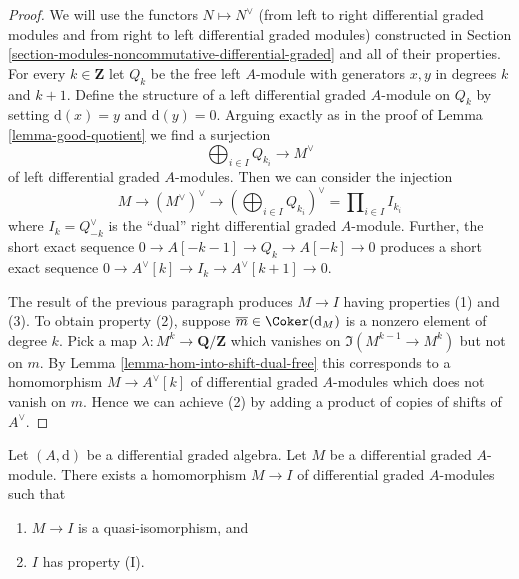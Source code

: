 \begin{proof}
We will use the functors $N \mapsto N^\vee$ (from left to right
differential graded modules and from right to left differential
graded modules) constructed in
Section \ref{section-modules-noncommutative-differential-graded}
and all of their properties.
For every $k \in \mathbf{Z}$ let $Q_k$ be the free left $A$-module with
generators $x, y$ in degrees $k$ and $k + 1$. Define the structure of a
left differential graded $A$-module on $Q_k$ by setting $\text{d}(x) = y$
and $\text{d}(y) = 0$. Arguing exactly as in the proof of
Lemma \ref{lemma-good-quotient} we find a surjection
$$
\bigoplus\nolimits_{i \in I} Q_{k_i} \longrightarrow M^\vee
$$
of left differential graded $A$-modules. Then we can consider the injection
$$
M \to (M^\vee)^\vee \to (\bigoplus\nolimits_{i \in I} Q_{k_i})^\vee =
\prod\nolimits_{i \in I} I_{k_i}
$$
where $I_k = Q_{-k}^\vee$ is the ``dual'' right differential graded $A$-module.
Further, the short exact sequence $0 \to A[-k - 1] \to Q_k \to A[-k] \to 0$
produces a short exact sequence
$0 \to A^\vee[k] \to I_k \to A^\vee[k + 1] \to 0$.

\medskip\noindent
The result of the previous paragraph produces $M \to I$
having properties (1) and (3). To obtain property (2), suppose
$\overline{m} \in \Coker(\text{d}_M)$ is a nonzero element of
degree $k$. Pick a map $\lambda : M^k \to \mathbf{Q}/\mathbf{Z}$
which vanishes on $\Im(M^{k - 1} \to M^k)$ but not on $m$. By
Lemma \ref{lemma-hom-into-shift-dual-free}
this corresponds to a homomorphism $M \to A^\vee[k]$ of
differential graded $A$-modules which does not vanish on $m$.
Hence we can achieve (2) by adding
a product of copies of shifts of $A^\vee$.
\end{proof}

\begin{lemma}
\label{lemma-right-resolution}
Let $(A, \text{d})$ be a differential graded algebra.
Let $M$ be a differential graded $A$-module. There exists a homomorphism
$M \to I$ of differential graded $A$-modules such that
\begin{enumerate}
\item $M \to I$ is a quasi-isomorphism, and
\item $I$ has property (I).
\end{enumerate}
\end{lemma}

